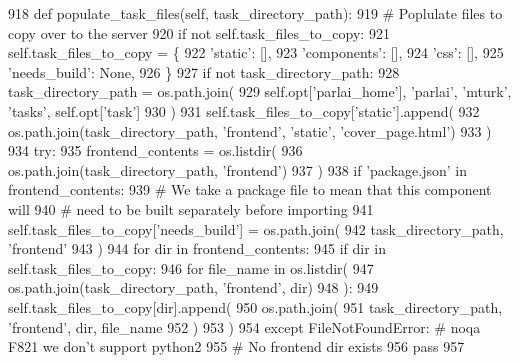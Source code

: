 \begin{DoxyCode}
918     \textcolor{keyword}{def }populate\_task\_files(self, task\_directory\_path):
919         \textcolor{comment}{# Poplulate files to copy over to the server}
920         \textcolor{keywordflow}{if} \textcolor{keywordflow}{not} self.task\_files\_to\_copy:
921             self.task\_files\_to\_copy = \{
922                 \textcolor{stringliteral}{'static'}: [],
923                 \textcolor{stringliteral}{'components'}: [],
924                 \textcolor{stringliteral}{'css'}: [],
925                 \textcolor{stringliteral}{'needs\_build'}: \textcolor{keywordtype}{None},
926             \}
927         \textcolor{keywordflow}{if} \textcolor{keywordflow}{not} task\_directory\_path:
928             task\_directory\_path = os.path.join(
929                 self.opt[\textcolor{stringliteral}{'parlai\_home'}], \textcolor{stringliteral}{'parlai'}, \textcolor{stringliteral}{'mturk'}, \textcolor{stringliteral}{'tasks'}, self.opt[\textcolor{stringliteral}{'task'}]
930             )
931         self.task\_files\_to\_copy[\textcolor{stringliteral}{'static'}].append(
932             os.path.join(task\_directory\_path, \textcolor{stringliteral}{'frontend'}, \textcolor{stringliteral}{'static'}, \textcolor{stringliteral}{'cover\_page.html'})
933         )
934         \textcolor{keywordflow}{try}:
935             frontend\_contents = os.listdir(
936                 os.path.join(task\_directory\_path, \textcolor{stringliteral}{'frontend'})
937             )
938             \textcolor{keywordflow}{if} \textcolor{stringliteral}{'package.json'} \textcolor{keywordflow}{in} frontend\_contents:
939                 \textcolor{comment}{# We take a package file to mean that this component will}
940                 \textcolor{comment}{# need to be built separately before importing}
941                 self.task\_files\_to\_copy[\textcolor{stringliteral}{'needs\_build'}] = os.path.join(
942                     task\_directory\_path, \textcolor{stringliteral}{'frontend'}
943                 )
944             \textcolor{keywordflow}{for} dir \textcolor{keywordflow}{in} frontend\_contents:
945                 \textcolor{keywordflow}{if} dir \textcolor{keywordflow}{in} self.task\_files\_to\_copy:
946                     \textcolor{keywordflow}{for} file\_name \textcolor{keywordflow}{in} os.listdir(
947                         os.path.join(task\_directory\_path, \textcolor{stringliteral}{'frontend'}, dir)
948                     ):
949                         self.task\_files\_to\_copy[dir].append(
950                             os.path.join(
951                                 task\_directory\_path, \textcolor{stringliteral}{'frontend'}, dir, file\_name
952                             )
953                         )
954         \textcolor{keywordflow}{except} FileNotFoundError:  \textcolor{comment}{# noqa F821 we don't support python2}
955             \textcolor{comment}{# No frontend dir exists}
956             \textcolor{keywordflow}{pass}
957 
\end{DoxyCode}
